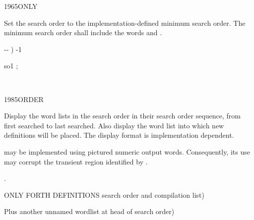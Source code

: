 \begin{worddef}{1965}{ONLY}
\item \stack{}{}

	Set the search order to the implementation-defined minimum search
	order. The minimum search order shall include the words
	 and .

	\begin{implement} %
		\word{:}   -{}- ) -1  \word{;}
	\end{implement}

	\begin{testing} %
		\ttfamily

		\word{:} so1  {;}  

		 \\
	\end{testing}
\end{worddef}


\begin{worddef}{1985}{ORDER}
\item \stack{}{}

	Display the word lists in the search order in their search order
	sequence, from first searched to last searched. Also display the
	word list into which new definitions will be placed. The display
	format is implementation dependent.

	 may be implemented using pictured numeric output
	words. Consequently, its use may corrupt the transient region
	identified by .

\see {}.

	\begin{testing} %
		\ttfamily
		  ONLY FORTH DEFINITIONS search order and compilation list)  \\

		  Plus another unnamed wordlist at head of search order)  \\
	\end{testing}
\end{worddef}


